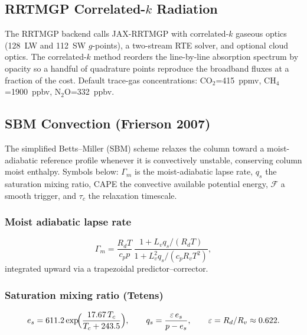 \documentclass[11pt,a4paper]{article}
\newcommand{\Rd}{R_d}
\newcommand{\cpd}{c_p}
\newcommand{\Lv}{L_v}
\newcommand{\Rv}{R_v}
\begin{document}
\subsection{RRTMGP Correlated-$k$ Radiation}

The RRTMGP backend \citep{Mlawer1997,Pincus2019} calls JAX-RRTMGP with correlated-$k$ gaseous optics (128~LW and 112~SW $g$-points), a two-stream RTE solver, and optional cloud optics.  The correlated-$k$ method reorders the line-by-line absorption spectrum by opacity so a handful of quadrature points reproduce the broadband fluxes at a fraction of the cost.  Default trace-gas concentrations: CO$_2$=415~ppmv, CH$_4$=1900~ppbv, N$_2$O=332~ppbv.

\subsection{SBM Convection (Frierson 2007)}

The simplified Betts--Miller (SBM) scheme \citep{Frierson2007} relaxes
the column toward a moist-adiabatic reference profile whenever it is
convectively unstable, conserving column moist enthalpy.  Symbols below:
$\Gamma_m$ is the moist-adiabatic lapse rate, $q_s$ the saturation
mixing ratio, CAPE the convective available potential energy,
$\mathcal F$ a smooth trigger, and $\tau_c$ the relaxation timescale.

\subsubsection{Moist adiabatic lapse rate}
\begin{equation}
  \Gamma_m = \frac{\Rd T}{\cpd p}\,\frac{1+\Lv q_s/(\Rd T)}{1+\Lv^2 q_s/(\cpd\Rv T^2)},
\end{equation}
integrated upward via a trapezoidal predictor--corrector.

\subsubsection{Saturation mixing ratio (Tetens)}
\begin{equation}
  e_s = 611.2\exp\!\Bigl(\frac{17.67\,T_c}{T_c+243.5}\Bigr), \qquad
  q_s = \frac{\varepsilon\,e_s}{p-e_s}, \qquad \varepsilon=\Rd/\Rv\approx 0.622.
\end{equation}
\end{document}
